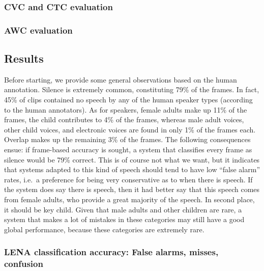 \documentclass[english,floatsintext,man]{apa6}
\begin{document}
\subsubsection{CVC and CTC evaluation}\label{cvc-and-ctc-evaluation}

\subsubsection{AWC evaluation}\label{awc-evaluation}

\subsection{Results}\label{results}

Before starting, we provide some general observations based on the human
annotation. Silence is extremely common, constituting 79\% of the
frames. In fact, 45\% of clips contained no speech by any of the human
speaker types (according to the human annotators). As for speakers,
female adults make up 11\% of the frames, the child contributes to 4\%
of the frames, whereas male adult voices, other child voices, and
electronic voices are found in only 1\% of the frames each. Overlap
makes up the remaining 3\% of the frames. The following consequences
ensue: if frame-based accuracy is sought, a system that classifies every
frame as silence would be 79\% correct. This is of course not what we
want, but it indicates that systems adapted to this kind of speech
should tend to have low \enquote{false alarm} rates, i.e.~a preference
for being very conservative as to when there is speech. If the system
does say there is speech, then it had better say that this speech comes
from female adults, who provide a great majority of the speech. In
second place, it should be key child. Given that male adults and other
children are rare, a system that makes a lot of mistakes in these
categories may still have a good global performance, because these
categories are extremely rare.

\subsubsection{LENA classification accuracy: False alarms, misses,
confusion}\label{lena-classification-accuracy-false-alarms-misses-confusion}
\end{document}
